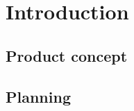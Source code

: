 

%

\chapter{Introduction}

%

\section{Product concept}%
\label{sec:product-concept}

%



\section{Planning}%
\label{sec:planning}

%

%
